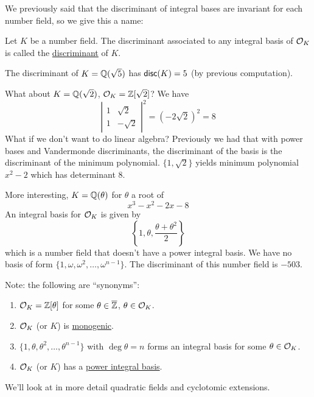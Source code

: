 We previously said that the discriminant of integral bases are invariant for each number field, so we give this a name:
\begin{definition}
    Let $K$ be a number field. The discriminant associated to any integral basis of $\mathcal{O}_K$ is called the \ul{discriminant} of $K$.
\end{definition}
\begin{example}
    The discriminant of $K = \mathbb Q(\sqrt{5})$ has $\operatorname{\mathsf{disc}}(K) = 5$ (by previous computation).
\end{example}
\begin{example}
    What about $K = \mathbb Q(\sqrt{2})$, $\mathcal{O}_K = \mathbb Z[\sqrt{2}]$? We have
    \[\left|\begin{array}{cc}1 & \sqrt{2} \\ 1 & -\sqrt{2}\end{array}\right|^2 = (-2\sqrt{2})^2 = 8\]
    What if we don't want to do linear algebra? Previously we had that with power bases and Vandermonde discriminants, the discriminant of the basis is the discriminant of the minimum polynomial. $\{1, \sqrt{2}\}$ yields minimum polynomial $x^2 - 2$ which has determinant $8$.
\end{example}
\begin{example}
    More interesting, $K = \mathbb Q(\theta)$ for $\theta$ a root of
    \[x^3 - x^2 - 2x - 8\]
    An integral basis for $\mathcal{O}_K$ is given by
    \[\left\{ 1, \theta, \frac{\theta + \theta^2}{2} \right\}\]
    which is a number field that doesn't have a power integral basis. We have no basis of form $\{1, \omega, \omega^2, \dots, \omega^{n-1}\}$. The discriminant of this number field is $-503$.
\end{example}
Note: the following are ``synonyms'':
\begin{enumerate}
    \item $\mathcal{O}_K = \mathbb Z[\theta]$ for some $\theta\in\overline{\mathbb Z}$, $\theta\in\mathcal{O}_K$.
    \item $\mathcal{O}_K$ (or $K$) is \ul{monogenic}.
    \item $\{1, \theta, \theta^2, \dots, \theta^{n-1}\}$ with $\deg\theta = n$ forms an integral basis for some $\theta\in\mathcal{O}_K$.
    \item $\mathcal{O}_K$ (or $K$) has a \ul{power integral basis}.
\end{enumerate}

We'll look at in more detail quadratic fields and cyclotomic extensions.

